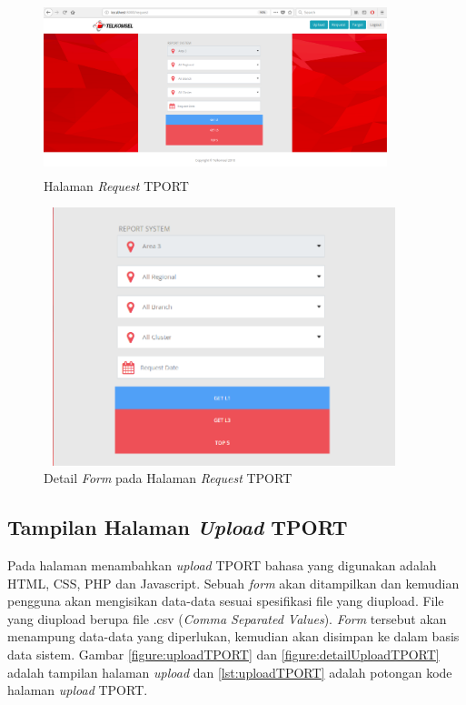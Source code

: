 \begin{figure}[h!]
	\centerline
	{\includegraphics[width=10cm,height=5cm]{bab5/tampilanRequest.png}}
	\caption{Halaman \textit{Request} TPORT}
	\label{figure:requestTPORT}
\end{figure}

\begin{figure}[h!]
	\centerline
	{\includegraphics[width=10.5cm,height=7.5cm]{bab5/detailTampilanRequest.png}}
	\caption{Detail \textit{Form} pada Halaman \textit{Request} TPORT}
	\label{figure:detailRequestTPORT}
\end{figure}



\subsection{Tampilan Halaman \textit{Upload} TPORT}
Pada halaman menambahkan \textit{upload} TPORT bahasa yang digunakan adalah HTML, CSS, PHP dan Javascript. Sebuah \textit{form} akan ditampilkan dan kemudian pengguna akan mengisikan data-data sesuai spesifikasi file yang diupload. File yang diupload berupa file .csv (\textit{Comma Separated Values}). \textit{Form} tersebut akan menampung data-data yang diperlukan, kemudian akan disimpan ke dalam basis data sistem. Gambar \ref{figure:uploadTPORT} dan \ref{figure:detailUploadTPORT} adalah tampilan halaman \textit{upload} dan \ref{lst:uploadTPORT} adalah potongan kode halaman \textit{upload} TPORT.

